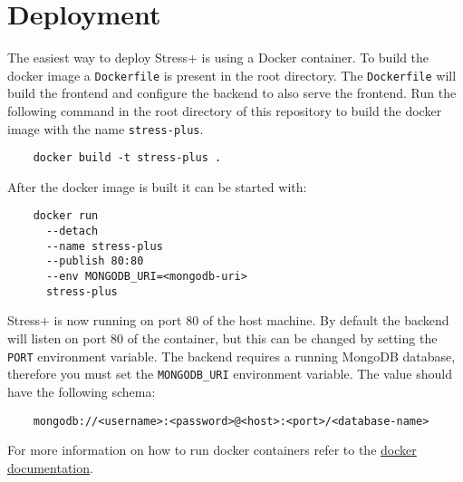 \section{Deployment}
\label{sec:deployment}

The easiest way to deploy Stress+ is using a Docker container.
To build the docker image a \texttt{Dockerfile} is present in the root directory. 
The \texttt{Dockerfile} will build the frontend and configure the backend to also serve the frontend. 
Run the following command in the root directory of this repository to build the docker image with the name \texttt{stress-plus}.
\begin{verbatim}
    docker build -t stress-plus .
\end{verbatim}
After the docker image is built it can be started with:
\begin{verbatim}
    docker run 
      --detach 
      --name stress-plus 
      --publish 80:80 
      --env MONGODB_URI=<mongodb-uri> 
      stress-plus
\end{verbatim}
Stress+ is now running on port $80$ of the host machine.
By default the backend will listen on port $80$ of the container, but this can be changed by setting the \texttt{PORT} environment variable.
The backend requires a running MongoDB database, therefore you must set the \texttt{MONGODB\_URI} environment variable. 
The value should have the following schema:
\begin{verbatim}
    mongodb://<username>:<password>@<host>:<port>/<database-name>
\end{verbatim}

For more information on how to run docker containers refer to the \href{https://docs.docker.com/engine/reference/commandline/run}{docker documentation}.
